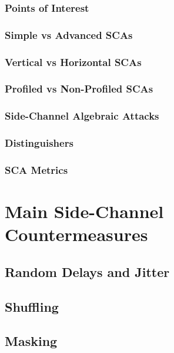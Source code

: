 \subsubsection{Points of Interest}
\subsubsection{Simple vs Advanced SCAs}
\subsubsection{Vertical vs Horizontal SCAs}
\subsubsection{Profiled vs Non-Profiled SCAs}
\subsubsection{Side-Channel Algebraic Attacks}
\subsubsection{Distinguishers}
\subsubsection{SCA Metrics}



\section{Main Side-Channel Countermeasures}
\subsection{Random Delays and Jitter}
\subsection{Shuffling}
\subsection{Masking}



